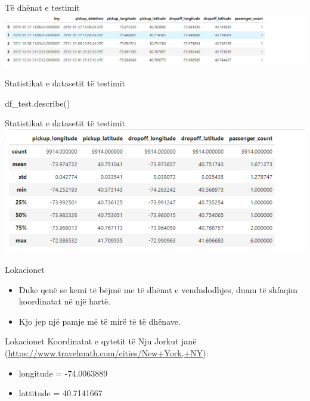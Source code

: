 \documentclass[
  ignorenonframetext,
]{beamer}
\newenvironment{Shaded}{\begin{snugshade}}{\end{snugshade}}
\newcommand{\NormalTok}[1]{#1}
\begin{document}
\begin{frame}{Të dhënat e testimit}
\protect\hypertarget{tuxeb-dhuxebnat-e-testimit-1}{}
\includegraphics{./Figs/train7.png}
\end{frame}

\begin{frame}[fragile]{Statistikat e datasetit të testimit}
\protect\hypertarget{statistikat-e-datasetit-tuxeb-testimit}{}

\begin{Shaded}
\begin{Highlighting}[]
\NormalTok{df\_test.describe()}
\end{Highlighting}
\end{Shaded}
\end{frame}

\begin{frame}{Statistikat e datasetit të testimit}
\protect\hypertarget{statistikat-e-datasetit-tuxeb-testimit-1}{}
\includegraphics{./Figs/train8.png}
\end{frame}

\begin{frame}{Lokacionet}
\protect\hypertarget{lokacionet}{}
\begin{itemize}
\item
  Duke qenë se kemi të bëjmë me të dhënat e vendndodhjes, duam të
  shfaqim koordinatat në një hartë.
\item
  Kjo jep një pamje më të mirë të të dhënave.
\end{itemize}
\end{frame}

\begin{frame}{Lokacionet}
\protect\hypertarget{lokacionet-1}{}
Koordinatat e qytetit të Nju Jorkut janë
(\url{https://www.travelmath.com/cities/New+York,+NY}):

\begin{itemize}
\item
  longitude = -74.0063889
\item
  lattitude = 40.7141667
\end{itemize}
\end{frame}
\end{document}
